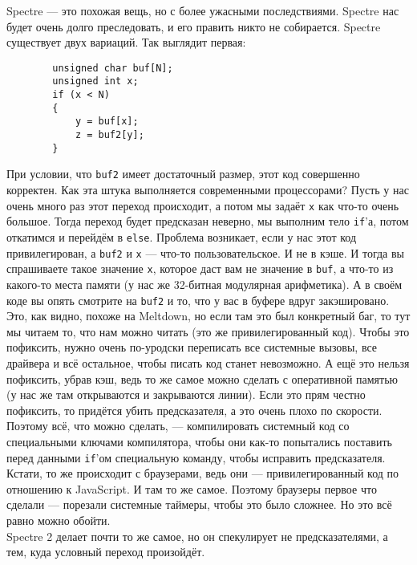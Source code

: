 \documentclass{article}
\begin{document}
    Spectre --- это похожая вещь, но с более ужасными последствиями. Spectre нас будет очень долго преследовать, и его править никто не собирается. Spectre существует двух вариаций. Так выглядит первая:
    \begin{verbatim}
        unsigned char buf[N];
        unsigned int x;
        if (x < N)
        {
            y = buf[x];
            z = buf2[y];
        }
    \end{verbatim}
    При условии, что \texttt{buf2} имеет достаточный размер, этот код совершенно корректен. Как эта штука выполняется современными процессорами? Пусть у нас очень много раз этот переход происходит, а потом мы задаёт \texttt{x} как что-то очень большое. Тогда переход будет предсказан неверно, мы выполним тело \texttt{if}'а, потом откатимся и перейдём в \texttt{else}. Проблема возникает, если у нас этот код привилегирован, а \texttt{buf2} и \texttt{x} --- что-то пользовательское. И не в кэше. И тогда вы спрашиваете такое значение \texttt{x}, которое даст вам не значение в \texttt{buf}, а что-то из какого-то места памяти (у нас же 32-битная модулярная арифметика). А в своём коде вы опять смотрите на \texttt{buf2} и то, что у вас в буфере вдруг закэшировано. Это, как видно, похоже на Meltdown, но если там это был конкретный баг, то тут мы читаем то, что нам можно читать (это же привилегированный код). Чтобы это пофиксить, нужно очень по-уродски переписать все системные вызовы, все драйвера и всё остальное, чтобы писать код станет невозможно. А ещё это нельзя пофиксить, убрав кэш, ведь то же самое можно сделать с оперативной памятью (у нас же там открываются и закрываются линии). Если это прям честно пофиксить, то придётся убить предсказателя, а это очень плохо по скорости. Поэтому всё, что можно сделать, --- компилировать системный код со специальными ключами компилятора, чтобы они как-то попытались поставить перед данными \texttt{if}'ом специальную команду, чтобы исправить предсказателя. Кстати, то же происходит с браузерами, ведь они --- привилегированный код по отношению к JavaScript. И там то же самое. Поэтому браузеры первое что сделали --- порезали системные таймеры, чтобы это было сложнее. Но это всё равно можно обойти.\\
    Spectre 2 делает почти то же самое, но он спекулирует не предсказателями, а тем, куда условный переход произойдёт.\\
\end{document}
